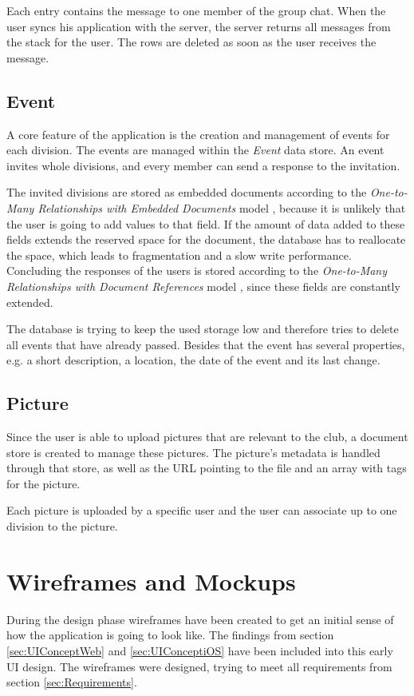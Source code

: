 Each entry contains the message to one member of the group chat. When the user syncs his application with the server, the server returns all messages from the stack for the user. The rows are deleted as soon as the user receives the message. 

\subsection{Event}
A core feature of the application is the creation and management of events for each division. The events are managed within the \emph{Event} data store. An event invites whole divisions, and every member can send a response to the invitation. 

The invited divisions are stored as embedded documents according to the \emph{One-to-Many Relationships with Embedded Documents} model \cite[p. 141]{Mongo:2014aa}, because it is unlikely that the user is going to add values to that field. If the amount of data added to these fields extends the reserved space for the document, the database has to reallocate the space, which leads to fragmentation and a slow write performance. Concluding the responses of the users is stored according to the \emph{One-to-Many Relationships with Document References} model \cite[p. 143]{Mongo:2014aa}, since these fields are constantly extended.

The database is trying to keep the used storage low and therefore tries to delete all events that have already passed. Besides that the event has several properties, e.g. a short description, a location, the date of the event and its last change.

\subsection{Picture}
Since the user is able to upload pictures that are relevant to the club, a document store is created to manage these pictures. The picture's metadata is handled through that store, as well as the URL pointing to the file and an array with tags for the picture.

Each picture is uploaded by a specific user and the user can associate up to one division to the picture.

\section{Wireframes and Mockups}
\label{sec:Wireframes}

During the design phase wireframes have been created to get an initial sense of how the application is going to look like. The findings from section \vref{sec:UIConceptWeb} and \vref{sec:UIConceptiOS} have been included into this early \gls{UI} design. The wireframes were designed, trying to meet all requirements from section \vref{sec:Requirements}.

